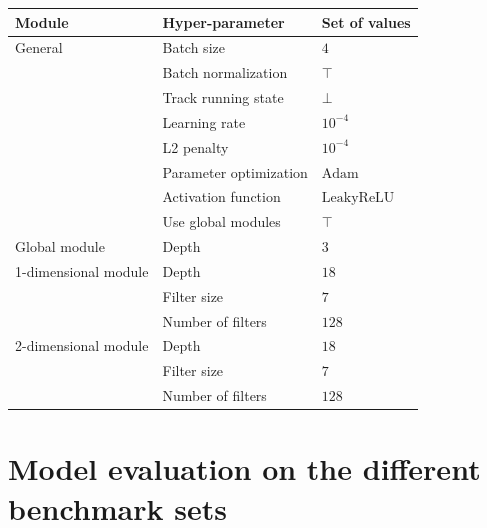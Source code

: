     \begin{table}[H]
        \centering
        \begin{tabular}{lll}
          \hline
          Module & Hyper-parameter & Set of values \\
          \hline
          \hline
          General & Batch size & $4$ \\
                  & Batch normalization & $\top$ \\
                  & Track running state & $\bot$ \\
                  & Learning rate & $10^{-4}$ \\
                  & L2 penalty & $10^{-4}$ \\
                  & Parameter optimization & $\text{Adam}$ \\
                  & Activation function & $\text{LeakyReLU}$ \\
                  & Use global modules & $\top$ \\
          \hline
          Global module & Depth & $3$ \\
          \hline
          1-dimensional module & Depth & $18$ \\
                               & Filter size & $7$ \\
                               & Number of filters & $128$ \\
          \hline
          2-dimensional module & Depth & $18$ \\
                               & Filter size & $7$ \\
                               & Number of filters & $128$ \\
          \hline
        \end{tabular}
        \label{besthp}
    \end{table}

\section{Model evaluation on the different benchmark sets}

